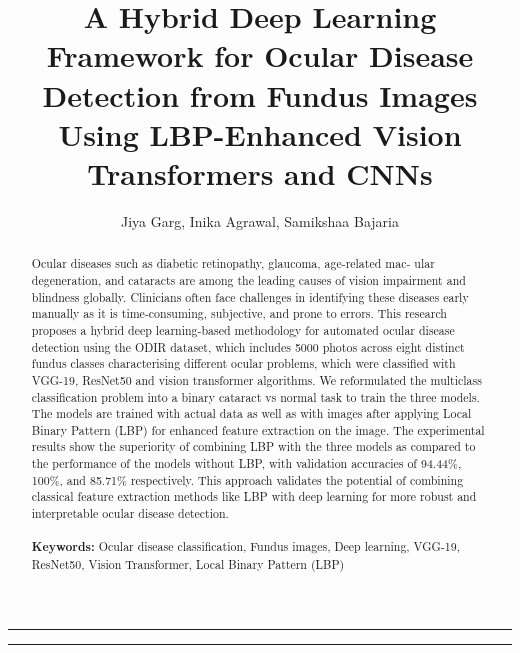 \documentclass{ijclclp}
\date{}
\affiliation{Netaji Subhas University of Technology, New Delhi}
\title {A Hybrid Deep Learning Framework for Ocular Disease Detection from Fundus Images Using LBP-Enhanced Vision Transformers and CNNs}
\author{Jiya Garg, 
Inika Agrawal, Samikshaa Bajaria
        }
\begin{document}
\maketitle



\thispagestyle{firstpage}
\rule{\linewidth}{0.5pt}
\begin{abstract}
\justifying
Ocular diseases such as diabetic retinopathy, glaucoma, age-related mac-
ular degeneration, and cataracts are among the leading causes of vision impairment and
blindness globally. Clinicians often face challenges in identifying these diseases early manually as it is time-consuming, subjective, and prone to errors. 
This research proposes a hybrid deep learning-based methodology for automated ocular disease detection using the ODIR dataset, which includes
5000 photos across eight distinct fundus classes characterising different ocular problems, which were classified with VGG-19, ResNet50 and vision transformer algorithms. We reformulated the multiclass classification problem into a binary cataract vs normal task to train the three models. The
models are trained with actual data as well as with images after applying Local Binary Pattern (LBP) for enhanced feature extraction on the image. The experimental results
show the superiority of combining LBP with the three models as compared to the performance of the models without LBP, with validation accuracies of 94.44\%, 100\%, and 85.71\% respectively. This approach validates the potential of combining classical feature extraction methods like LBP with deep learning for more robust and interpretable ocular disease detection.
\newline 
\\ 
\\
\textbf{Keywords:} 
Ocular disease classification, 
Fundus images, 
Deep learning, 
VGG-19, 
ResNet50, 
Vision Transformer, 
Local Binary Pattern (LBP)
\end{abstract}
\rule{\linewidth}{0.5pt}
\end{document}
